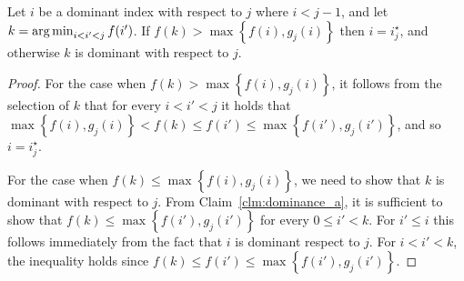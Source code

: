 \begin{claim}
	\label{clm:dominance_next}
	Let $i$ be a dominant index with respect to $j$ where $i < j-1$, and let $k = \operatorname*{arg\,min}_{i < i' < j} f(i')$. 
	If $f(k) > \max\left\{f(i), g_j(i)\right\}$ then $i = i^\star_j$, and otherwise $k$ is dominant with respect to $j$.
\end{claim}

\begin{proof}
	For the case when $f(k) > \max\left\{f(i), g_j(i)\right\}$, it follows from the selection of $k$ that for every $i < i' < j$ it holds that $\max\left\{f(i), g_j(i)\right\} < f(k) \leq f(i') \leq \max\left\{f(i'), g_j(i')\right\}$, and so $i = i^\star_j$.
	
	For the case when $f(k) \leq \max\left\{f(i), g_j(i)\right\}$, we need to show that $k$ is dominant with respect to $j$. From Claim~\ref{clm:dominance_a}, it is sufficient to show that $f(k) \leq \max\left\{f(i'), g_j(i')\right\}$ for every $0 \leq i' < k$. For $i' \leq i$ this follows immediately from the fact that $i$ is dominant respect to $j$. For $i < i' < k$, the inequality holds since $f(k) \leq f(i') \leq \max\left\{f(i'), g_j(i')\right\}$.
\end{proof}

